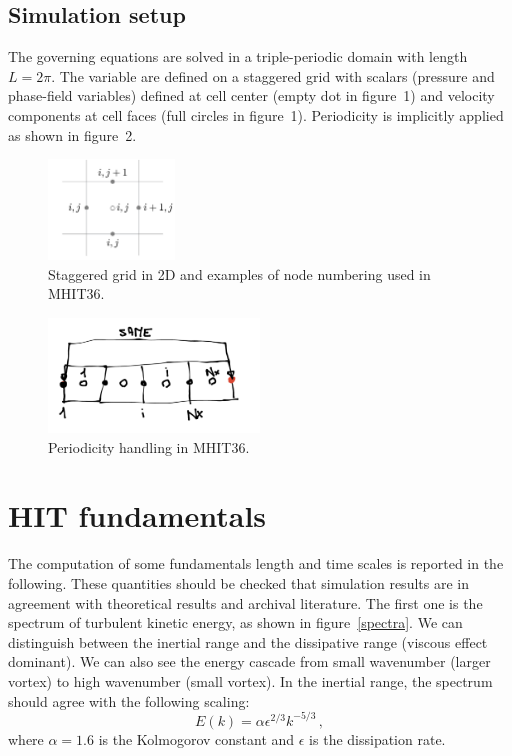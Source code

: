 \documentclass[11pt]{article}
\begin{document}
\subsection{Simulation setup}
The governing equations are solved in a triple-periodic domain with length $L=2 \pi$.
The variable are defined on a staggered grid with scalars (pressure and phase-field variables) defined at cell center (empty dot in figure~1) and velocity components at cell faces (full circles in figure~1).
Periodicity is implicitly applied as shown in figure~2.






\begin{figure}[!t]
\centering
    \includegraphics[width=0.3\textwidth]{staggered_2.png} 
    \caption{Staggered grid in 2D and examples of node numbering used in MHIT36.}
    \label{fig1}
\end{figure}

\begin{figure}[!t]
\centering
    \includegraphics[width=0.5\textwidth]{draw.png} 
    \caption{Periodicity handling in MHIT36.}
    \label{fig2}
\end{figure}



\section{HIT fundamentals}

The computation of some fundamentals length and time scales is reported in the following.
These quantities should be checked that simulation results are in agreement with theoretical results and archival literature.
The first one is the spectrum of turbulent kinetic energy, as shown in figure~\ref{spectra}.
We can distinguish between the inertial range and the dissipative range (viscous effect dominant).
We can also see the energy cascade from small wavenumber (larger vortex) to high wavenumber (small vortex).
In the inertial range, the spectrum should agree with the following scaling:
\begin{equation}
E(k)=\alpha \epsilon^{2/3} k^{-5/3}\, ,
\end{equation}
where $\alpha=1.6$ is the Kolmogorov constant and $\epsilon$ is the dissipation rate.
\end{document}

